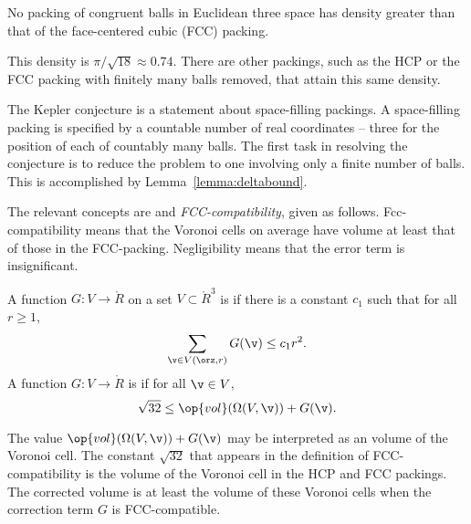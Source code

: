 \begin{theorem} 
\label{theorem:kepler}   
%
No packing of congruent balls in Euclidean three space has density
greater than that of the face-centered cubic (FCC) packing.
\end{theorem}

\begin{remark}
This density is $\pi/\sqrt{18}\approx 0.74.$  There are other
packings, such as the HCP or the FCC
packing with finitely many balls removed, that attain this
same density.
\end{remark}

The Kepler conjecture is a statement about space-filling packings.  A
space-filling packing is specified by a countable number of real coordinates --
three for the position of each of countably many balls.  The first
task in resolving the conjecture is to reduce the problem to one
involving only a finite number of balls.  This is accomplished by
Lemma~\ref{lemma:deltabound}.

The relevant concepts are  and {\it
  FCC-compatibility}, given as follows.  Fcc-compatibility means that
the Voronoi cells on average have volume at least that of those in the
FCC-packing.  Negligibility means that the error term is insignificant.


\begin{definition}\label{def:negligible}
A function $G:V\to \ring{R}$ on a set $V\subset\ring{R}^3$
is 
if there is a constant $c_1$ such that for all $r\ge1$,
\[ \sum_{\v\in V(\orz,r)} G(\v) \le c_1
r^2.\] 
A function $G: V\to\ring{R}$ is
if for all $\v\in V$, 
\[ \sqrt{32}\le \op{vol}(\Omega(V,\v)) +
G(\v).\] 
%
%
%
\end{definition}


\begin{remark}
  The value $\op{vol}(\Omega(V,\v)) + G(\v)$ may be interpreted as an
   volume of the Voronoi cell. The constant
  $\sqrt{32}$ that appears in the definition of FCC-compatibility is
  the volume of the Voronoi cell in the HCP and FCC packings.  The
  corrected volume is at least the volume of these Voronoi cells when
  the correction term $G$ is FCC-compatible.  
%
%
\end{remark}

